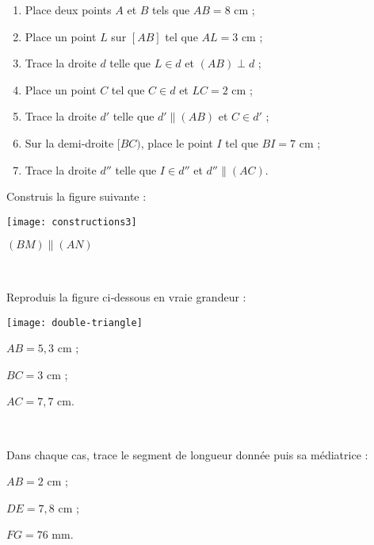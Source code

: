 \begin{exercice}
\begin{enumerate}
 \item Place deux points $A$ et $B$ tels que $AB = 8$ cm ;
 \item Place un point $L$ sur $[AB]$ tel que $AL = 3$ cm ;
 \item Trace la droite $d$ telle que $L \in d$ et $(AB) \perp d$ ;
 \item Place un point $C$ tel que $C \in d$ et $LC = 2$ cm ;
 \item Trace la droite $d'$ telle que $d' \parallel (AB)$ et $C \in d'$ ;
 \item Sur la demi‑droite $[BC)$, place le point $I$ tel que $BI = 7$ cm ;
 \item Trace la droite $d''$ telle que $I \in d''$ et $d'' \parallel (AC)$.
 \end{enumerate}
\end{exercice}


\begin{exercice}
Construis la figure suivante : \\[0.75em]
\begin{minipage}[c]{0.2\textwidth}
\texttt{[image: constructions3]}
 \end{minipage} \hfill%
 \begin{minipage}[c]{0.2\textwidth}
 $(BM) \parallel (AN)$
  \end{minipage} \\
\end{exercice}


\begin{exercice}
Reproduis la figure ci‑dessous en vraie grandeur : \\[0.75em]
\begin{minipage}[c]{0.3\textwidth}
\texttt{[image: double-triangle]}
 \end{minipage} \hfill%
 \begin{minipage}[c]{0.4\textwidth}
$AB = 5,3$ cm ;

$BC = 3$ cm ;

$AC = 7,7$ cm.
 \end{minipage} \\
\end{exercice}



\begin{exercice}[Médiatrices]
Dans chaque cas, trace le segment de longueur donnée puis sa médiatrice :
 \begin{colenumerate}{3}
  \item $AB = 2$ cm ;
  \item $DE = 7,8$ cm ;
  \item $FG = 76$ mm.
  \end{colenumerate}
\end{exercice}


